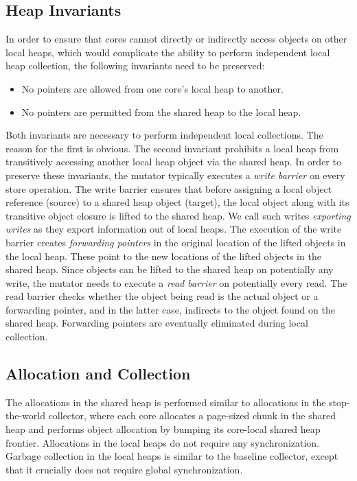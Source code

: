 \subsection{Heap Invariants}

In order to ensure that cores cannot directly or indirectly access objects on
other local heaps, which would complicate the ability to perform independent
local heap collection, the following invariants need to be preserved:

\begin{itemize}
\item No pointers are allowed from one core's local heap to another.
\item No pointers are permitted from the shared heap to the local heap.
\end{itemize}

\noindent Both invariants are necessary to perform independent local
collections.  The reason for the first is obvious.  The second invariant
prohibits a local heap from transitively accessing another local heap object
via the shared heap.  In order to preserve these invariants, the mutator
typically executes a \emph{write barrier} on every store operation. The write
barrier ensures that before assigning a local object reference (source) to a
shared heap object (target), the local object along with its transitive object
closure is lifted to the shared heap. We call such writes \emph{exporting
writes} as they export information out of local heaps.  The execution of the
write barrier creates \emph{forwarding pointers} in the original location of
the lifted objects in the local heap. These point to the new locations of the
lifted objects in the shared heap. Since objects can be lifted to the shared
heap on potentially any write, the mutator needs to execute a \emph{read
barrier} on potentially every read. The read barrier checks whether the object
being read is the actual object or a forwarding pointer, and in the latter
case, indirects to the object found on the shared heap.  Forwarding pointers
are eventually eliminated during local collection.

\subsection{Allocation and Collection}

The allocations in the shared heap is performed similar to allocations in the
stop-the-world collector, where each core allocates a page-sized chunk in the
shared heap and performs object allocation by bumping its core-local shared
heap frontier. Allocations in the local heaps do not require any
synchronization. Garbage collection in the local heaps is similar to the
baseline collector, except that it crucially does not require global
synchronization.

